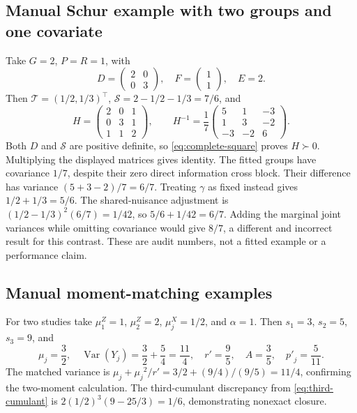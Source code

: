 \documentclass[11pt,a4paper]{article}
\newcommand{\Var}{\operatorname{Var}}
\numberwithin{equation}{section}
\begin{document}
\subsection{Manual Schur example with two groups and one covariate}
Take $G=2$, $P=R=1$, with
\begin{equation}
 D=\begin{pmatrix}2&0\\0&3\end{pmatrix},\quad
 F=\begin{pmatrix}1\\1\end{pmatrix},\quad E=2.
\end{equation}
Then $\mathcal T=(1/2,1/3)^\top$, ${\mathcal S}=2-1/2-1/3=7/6$, and
\begin{equation}
 H=\begin{pmatrix}2&0&1\\0&3&1\\1&1&2\end{pmatrix},
 \qquad H^{-1}=\frac17
 \begin{pmatrix}5&1&-3\\1&3&-2\\-3&-2&6\end{pmatrix}.
\end{equation}
Both $D$ and ${\mathcal S}$ are positive definite, so \eqref{eq:complete-square}
proves $H\succ0$. Multiplying the displayed matrices gives identity.
The fitted groups have covariance $1/7$, despite their zero direct
information cross block. Their difference has variance
$(5+3-2)/7=6/7$.
Treating $\gamma$ as fixed instead gives $1/2+1/3=5/6$.
The shared-nuisance adjustment is
$(1/2-1/3)^2(6/7)=1/42$, so $5/6+1/42=6/7$.
Adding the marginal joint variances while omitting covariance would give
$8/7$, a different and incorrect result for this contrast.
These are audit numbers, not a fitted example or a performance claim.

\subsection{Manual moment-matching examples}
For two studies take $\mu_1^Z=1$, $\mu_2^Z=2$, $\mu_j^X=1/2$, and $\alpha=1$.
Then $s_1=3$, $s_2=5$, $s_3=9$, and
\begin{equation}
 {\mu_j}=\frac32,\quad \Var(Y_j)=\frac32+\frac54=\frac{11}{4},\quad
 {r'}=\frac95,\quad A=\frac35,\quad {p'}_j=\frac5{11}.
\end{equation}
The matched variance is
${\mu_j}+{\mu_j}^2/{r'}=3/2+(9/4)/(9/5)=11/4$,
confirming the two-moment calculation.
The third-cumulant discrepancy from \eqref{eq:third-cumulant} is
$2(1/2)^3(9-25/3)=1/6$, demonstrating nonexact closure.
\end{document}
